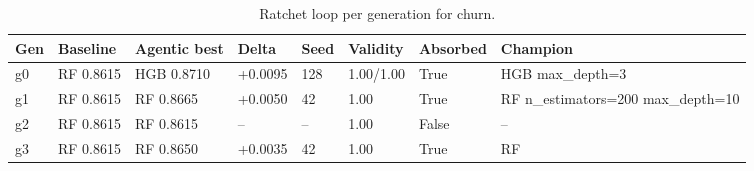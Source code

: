 \begin{table}[H]
\centering\small
\caption{Ratchet loop per generation for churn.}
\label{tab:ratchet-generations-ratchet-ledger-churn}
\begin{tabular}{llllllll}
\toprule
Gen & Baseline & Agentic best & Delta & Seed & Validity & Absorbed & Champion \\
\midrule
g0 & RF 0.8615 & HGB 0.8710 & +0.0095 & 128 & 1.00/1.00 & True & HGB max\_depth=3 \\
g1 & RF 0.8615 & RF 0.8665 & +0.0050 & 42 & 1.00 & True & RF n\_estimators=200 max\_depth=10 \\
g2 & RF 0.8615 & RF 0.8615 & -- & -- & 1.00 & False & -- \\
g3 & RF 0.8615 & RF 0.8650 & +0.0035 & 42 & 1.00 & True & RF \\
\bottomrule
\end{tabular}
\end{table}
